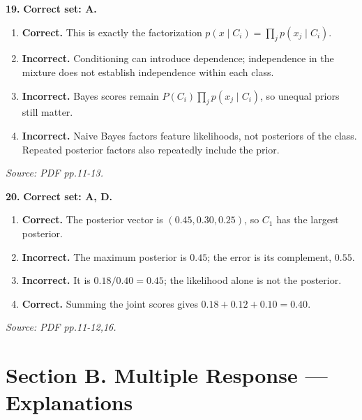 \documentclass[11pt,a4paper]{article}
\begin{document}
\par\noindent\begin{minipage}{\linewidth}
\textbf{19.} \textbf{Correct set: A.}
\begin{enumerate}[label=(\Alph*),leftmargin=8mm,itemsep=2pt,topsep=2pt]
\item \textbf{Correct.} This is exactly the factorization \(p(x\mid C_i)=\prod_jp(x_j\mid C_i)\).
\item \textbf{Incorrect.} Conditioning can introduce dependence; independence in the mixture does not establish independence within each class.
\item \textbf{Incorrect.} Bayes scores remain \(P(C_i)\prod_jp(x_j\mid C_i)\), so unequal priors still matter.
\item \textbf{Incorrect.} Naive Bayes factors feature likelihoods, not posteriors of the class. Repeated posterior factors also repeatedly include the prior.
\end{enumerate}
{\footnotesize\textit{Source: PDF pp.11-13.}}

\end{minipage}\par\vspace{3mm}
\par\noindent\begin{minipage}{\linewidth}
\textbf{20.} \textbf{Correct set: A, D.}
\begin{enumerate}[label=(\Alph*),leftmargin=8mm,itemsep=2pt,topsep=2pt]
\item \textbf{Correct.} The posterior vector is \((0.45,0.30,0.25)\), so \(C_1\) has the largest posterior.
\item \textbf{Incorrect.} The maximum posterior is \(0.45\); the error is its complement, \(0.55\).
\item \textbf{Incorrect.} It is \(0.18/0.40=0.45\); the likelihood alone is not the posterior.
\item \textbf{Correct.} Summing the joint scores gives \(0.18+0.12+0.10=0.40\).
\end{enumerate}
{\footnotesize\textit{Source: PDF pp.11-12,16.}}

\end{minipage}\par\vspace{3mm}
\newpage\section*{Section B. Multiple Response --- Explanations}
\end{document}
